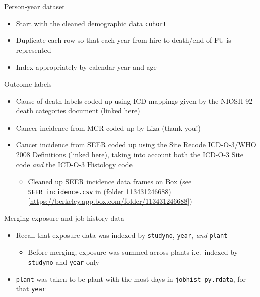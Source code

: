 \documentclass[
  ignorenonframetext,
  aspectratio=169,
]{beamer}
\providecommand{\tightlist}{%
  \setlength{\itemsep}{0pt}\setlength{\parskip}{0pt}}
\begin{document}
\begin{frame}[fragile]{Person-year dataset}
\protect\hypertarget{person-year-dataset}{}

\begin{itemize}
\tightlist
\item
  Start with the cleaned demographic data \texttt{cohort}
\item
  Duplicate each row so that each year from hire to death/end of FU is
  represented
\item
  Index appropriately by calendar year and age
\end{itemize}

\end{frame}

\begin{frame}[fragile]{Outcome labels}
\protect\hypertarget{outcome-labels}{}

\begin{itemize}
\tightlist
\item
  Cause of death labels coded up using ICD mappings given by the
  NIOSH-92 death categories document (linked
  \href{https://www.cdc.gov/niosh/ltas/pdf/Rate-Info-Table-3.pdf}{here})
\item
  Cancer incidence from MCR coded up by Liza (thank you!)
\item
  Cancer incidence from SEER coded up using the Site Recode ICD-O-3/WHO
  2008 Definitions (linked
  \href{https://seer.cancer.gov/siterecode/icdo3_dwhoheme/index.html}{here}),
  taking into account both the ICD-O-3 Site code \emph{and} the ICD-O-3
  Histology code

  \begin{itemize}
  \tightlist
  \item
    Cleaned up SEER incidence data frames on Box (see
    \texttt{SEER\ incidence.csv} in (folder
    113431246688){[}\url{https://berkeley.app.box.com/folder/113431246688}{]})
  \end{itemize}
\end{itemize}

\end{frame}

\begin{frame}[fragile]{Merging exposure and job history data}
\protect\hypertarget{merging-exposure-and-job-history-data}{}

\begin{itemize}
\tightlist
\item
  Recall that exposure data was indexed by \texttt{studyno},
  \texttt{year}, \emph{and} \texttt{plant}

  \begin{itemize}
  \tightlist
  \item
    Before merging, exposure was summed across plants i.e.~indexed by
    \texttt{studyno} and \texttt{year} only
  \end{itemize}
\item
  \texttt{plant} was taken to be plant with the most days in
  \texttt{jobhist\_py.rdata}, for that \texttt{year}
\end{itemize}

\end{frame}
\end{document}
